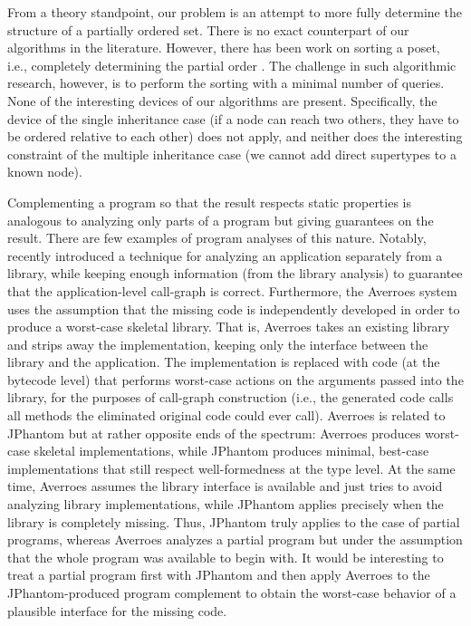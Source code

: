 From a theory standpoint, our problem is an attempt to more fully
determine the structure of a partially ordered set. There is no exact
counterpart of our algorithms in the literature. However, there has
been work on sorting a poset, i.e., completely determining the partial
order \cite{soda/DaskalakisKMRV09}.  The challenge in such algorithmic
research, however, is to perform the sorting with a minimal number of
queries. None of the interesting devices of our algorithms are
present. Specifically, the device of the single inheritance case (if a
node can reach two others, they have to be ordered relative to each
other) does not apply, and neither does the interesting constraint of
the multiple inheritance case (we cannot add direct supertypes to a
known node).

Complementing a program so that the result respects static properties
is analogous to analyzing only parts of a program but giving
guarantees on the result. There are few examples of program analyses
of this nature. Notably, \citeauthor{ecoop/AliL12} recently introduced
a technique \cite{ecoop/AliL12} for analyzing an application
separately from a library, while keeping enough information (from the
library analysis) to guarantee that the application-level call-graph
is correct. Furthermore, the Averroes system \cite{ecoop/AliL13} uses
the assumption that the missing code is independently developed in
order to produce a worst-case skeletal library. That is, Averroes
takes an existing library and strips away the implementation, keeping
only the interface between the library and the application. The
implementation is replaced with code (at the bytecode level) that
performs worst-case actions on the arguments passed into the library,
for the purposes of call-graph construction (i.e., the generated code
calls all methods the eliminated original code could ever
call). Averroes is related to JPhantom but at rather opposite ends of
the spectrum: Averroes produces worst-case skeletal implementations,
while JPhantom produces minimal, best-case implementations that still
respect well-formedness at the type level.  At the same time, Averroes
assumes the library interface is available and just tries to avoid
analyzing library implementations, while JPhantom applies precisely
when the library is completely missing. Thus, JPhantom truly applies
to the case of partial programs, whereas Averroes analyzes a partial
program but under the assumption that the whole program was available
to begin with. It would be interesting to treat a partial program
first with JPhantom and then apply Averroes to the JPhantom-produced
program complement to obtain the worst-case behavior of a plausible
interface for the missing code.

